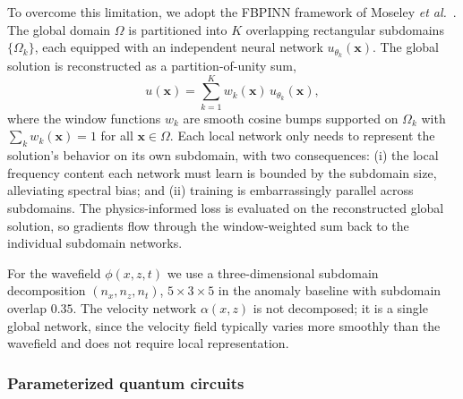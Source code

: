 To overcome this limitation, we adopt the FBPINN framework of Moseley \emph{et al.}~\cite{Moseley2023}. The global domain $\Omega$ is partitioned into $K$ overlapping rectangular subdomains $\{\Omega_k\}$, each equipped with an independent neural network $u_{\theta_k}(\mathbf{x})$. The global solution is reconstructed as a partition-of-unity sum,
\begin{equation}
    u(\mathbf{x}) = \sum_{k=1}^{K} w_k(\mathbf{x})\, u_{\theta_k}(\mathbf{x}),
\end{equation}
where the window functions $w_k$ are smooth cosine bumps supported on $\Omega_k$ with $\sum_k w_k(\mathbf{x}) = 1$ for all $\mathbf{x} \in \Omega$. Each local network only needs to represent the solution's behavior on its own subdomain, with two consequences: (i) the local frequency content each network must learn is bounded by the subdomain size, alleviating spectral bias; and (ii) training is embarrassingly parallel across subdomains. The physics-informed loss is evaluated on the reconstructed global solution, so gradients flow through the window-weighted sum back to the individual subdomain networks.

For the wavefield $\phi(x,z,t)$ we use a three-dimensional subdomain decomposition $(n_x, n_z, n_t)$, $5\!\times\!3\!\times\!5$ in the anomaly baseline with subdomain overlap $0.35$. The velocity network $\alpha(x,z)$ is not decomposed; it is a single global network, since the velocity field typically varies more smoothly than the wavefield and does not require local representation.

\subsubsection{Parameterized quantum circuits}
\label{sec:ch4-methods-pqc}

